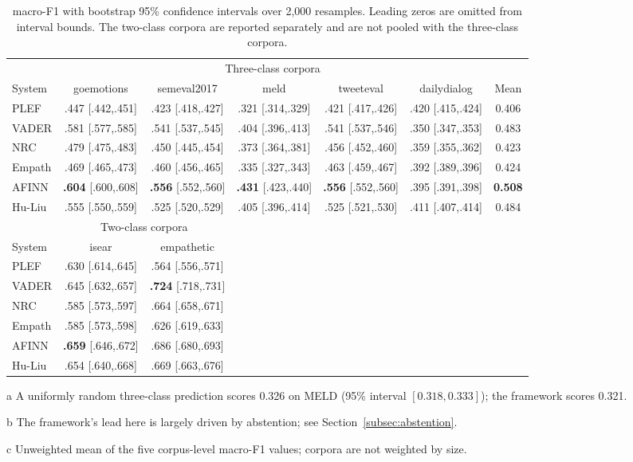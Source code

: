 \documentclass[fleqn,10pt]{wlscirep}
\providecommand{\botrule}{\bottomrule}
\begin{document}
\begin{table}[ht]
\centering
\small
\caption{macro-F1 with bootstrap 95\% confidence intervals over 2{,}000 resamples. Leading zeros are omitted from interval bounds. The two-class corpora are reported separately and are not pooled with the three-class corpora.}
\label{tab:f1}
\begin{threeparttable}
\begin{tabular}{lccccc c}
\toprule
& \multicolumn{5}{c}{Three-class corpora} & \\
\cmidrule(lr){2-6}
System & goemotions & semeval2017 & meld\tnote{a} & tweeteval & dailydialog\tnote{b} & Mean \\
\midrule
PLEF   & .447 [.442,.451] & .423 [.418,.427] & .321 [.314,.329] & .421 [.417,.426] & .420 [.415,.424] & 0.406 \\
VADER  & .581 [.577,.585] & .541 [.537,.545] & .404 [.396,.413] & .541 [.537,.546] & .350 [.347,.353] & 0.483 \\
NRC    & .479 [.475,.483] & .450 [.445,.454] & .373 [.364,.381] & .456 [.452,.460] & .359 [.355,.362] & 0.423 \\
Empath & .469 [.465,.473] & .460 [.456,.465] & .335 [.327,.343] & .463 [.459,.467] & .392 [.389,.396] & 0.424 \\
AFINN  & \textbf{.604} [.600,.608] & \textbf{.556} [.552,.560] & \textbf{.431} [.423,.440] & \textbf{.556} [.552,.560] & .395 [.391,.398] & \textbf{0.508} \\
Hu-Liu & .555 [.550,.559] & .525 [.520,.529] & .405 [.396,.414] & .525 [.521,.530] & .411 [.407,.414] & 0.484 \\
\midrule
& \multicolumn{2}{c}{Two-class corpora} & & & & \\
\cmidrule(lr){2-3}
System & isear & empathetic & & & & \\
\midrule
PLEF   & .630 [.614,.645] & .564 [.556,.571] & & & & \\
VADER  & .645 [.632,.657] & \textbf{.724} [.718,.731] & & & & \\
NRC    & .585 [.573,.597] & .664 [.658,.671] & & & & \\
Empath & .585 [.573,.598] & .626 [.619,.633] & & & & \\
AFINN  & \textbf{.659} [.646,.672] & .686 [.680,.693] & & & & \\
Hu-Liu & .654 [.640,.668] & .669 [.663,.676] & & & & \\
\botrule
\end{tabular}
\begin{tablenotes}\footnotesize
\item[a] A uniformly random three-class prediction scores 0.326 on MELD (95\% interval $[0.318,0.333]$); the framework scores 0.321.
\item[b] The framework's lead here is largely driven by abstention; see Section~\ref{subsec:abstention}.
\item[c] Unweighted mean of the five corpus-level macro-F1 values; corpora are not weighted by size.
\end{tablenotes}
\end{threeparttable}
\end{table}
\end{document}
